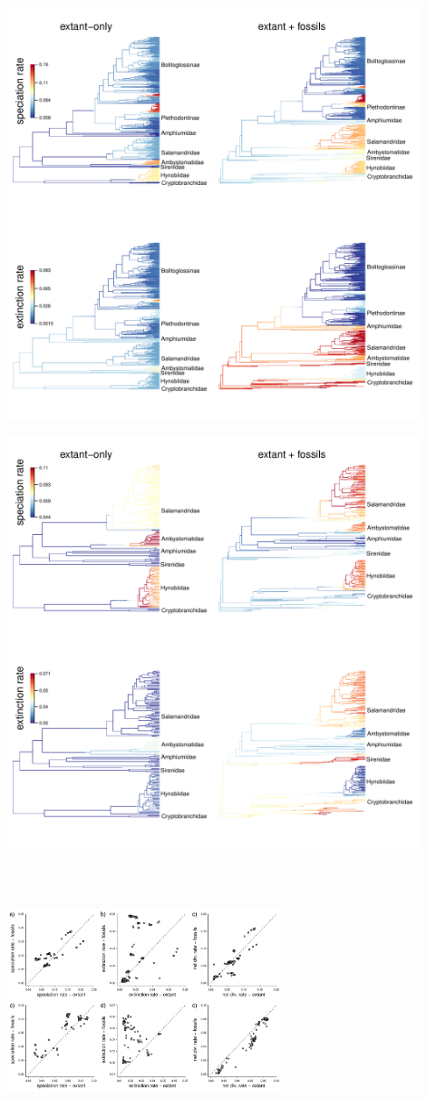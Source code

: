 \documentclass{article}
\begin{document}
\includegraphics[width=12cm, height=12cm]{spexComparison.pdf}

\includegraphics[width=12cm, height=12cm]{spexComparison_np.pdf}

\includegraphics[width=8cm, height=8cm]{rateCors.pdf}
\end{document}
